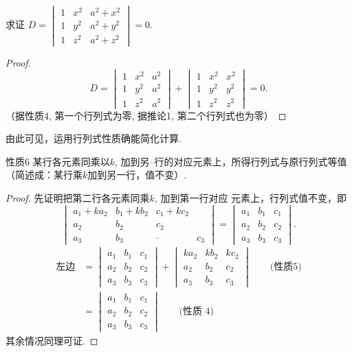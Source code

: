 \begin{example}
  求证
$D=\begin{vmatrix}1&x^{2}&a^{2}+x^{2}\\1&y^{2}&a^{2}+y^{2}\\1&z^{2}&a^{2}+z^{2}\end{vmatrix}=0.$
\end{example}

\begin{proof}
  $$D=\begin{vmatrix}1&x^2&a^2\\1&y^2&a^2\\1&z^2&a^2\end{vmatrix}+\begin{vmatrix}1&x^2&x^2\\1&y^2&y^2\\1&z^2&z^2\end{vmatrix}=0.$$
（据性质4, 第一个行列式为零, 据推论1, 第二个行列式也为零）
\end{proof}


由此可见，运用行列式性质确能简化计算.

\begin{thm}
{性质6} 某行各元素同乘以$k$, 加到另--行的对应元素上，所得行列式与原行列式等值（简述成：某行乘$k$加到另一行，值不变）.  
\end{thm}

\begin{proof}
  先证明把第二行各元素同乘$k$, 加到第一行对应
元素上，行列式值不变，即
$$\begin{vmatrix}a_1+ka_2&b_1+kb_2&c_1+kc_2\\a_2&b_2&c_2\\a_3&b_3&\cdot&c_3\end{vmatrix}=\begin{vmatrix}a_1&b_1&c_1\\a_2&b_2&c_2\\a_3&b_3&c_3\end{vmatrix}.$$
\[\begin{split}
  \text{左边}&=\begin{vmatrix} a_1& b_1& c_1\\ a_2& b_2& c_2\\ a_3& b_3& c_3\end{vmatrix} + \begin{vmatrix} ka_2& kb_2& kc_2\\ a_2& b_2& c_2\\ a_3& b_3& c_3\end{vmatrix}\qquad  \text{(性质5)}\\
  &= \begin{vmatrix} a_1& b_1& c_1\\ a_2& b_2& c_2\\ a_3& b_3& c_3\end{vmatrix} \qquad  \text{(性质 4)}
\end{split}\]
其余情况同理可证.
\end{proof}

